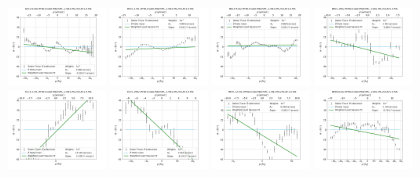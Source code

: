 \documentclass[fleqn,usenatbib]{mnras}
\begin{document}
\begin{figure}
    \includegraphics[width=0.23\textwidth]{Images/WLSFITS/CPSB/8331-6104.png}
    \includegraphics[width=0.23\textwidth]{Images/WLSFITS/CPSB/8555-3701.png}
    \includegraphics[width=0.23\textwidth]{Images/WLSFITS/CPSB/8623-9102.png}
    \includegraphics[width=0.23\textwidth]{Images/WLSFITS/CPSB/8655-1902.png}
    \includegraphics[width=0.23\textwidth]{Images/WLSFITS/CPSB/8713-3701.png}
    \includegraphics[width=0.23\textwidth]{Images/WLSFITS/CPSB/8725-1902.png}
    \includegraphics[width=0.23\textwidth]{Images/WLSFITS/CPSB/8935-12701.png}
    \includegraphics[width=0.23\textwidth]{Images/WLSFITS/CPSB/8938-6102.png}

\end{figure}
\end{document}
